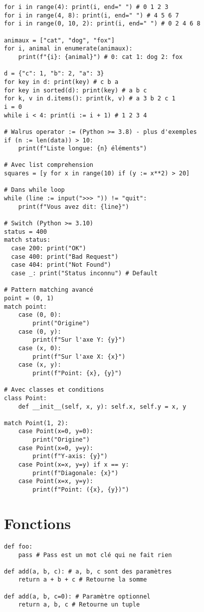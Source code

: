 \documentclass{article}
\begin{document}
\begin{multicols*}{4}
\begin{lstlisting}
for i in range(4): print(i, end=" ") # 0 1 2 3
for i in range(4, 8): print(i, end=" ") # 4 5 6 7
for i in range(0, 10, 2): print(i, end=" ") # 0 2 4 6 8

animaux = ["cat", "dog", "fox"]
for i, animal in enumerate(animaux):
    print(f"{i}: {animal}") # 0: cat 1: dog 2: fox

d = {"c": 1, "b": 2, "a": 3}
for key in d: print(key) # c b a
for key in sorted(d): print(key) # a b c
for k, v in d.items(): print(k, v) # a 3 b 2 c 1
i = 0
while i < 4: print(i := i + 1) # 1 2 3 4

# Walrus operator := (Python >= 3.8) - plus d'exemples
if (n := len(data)) > 10:
    print(f"Liste longue: {n} éléments")

# Avec list comprehension
squares = [y for x in range(10) if (y := x**2) > 20]

# Dans while loop
while (line := input(">>> ")) != "quit":
    print(f"Vous avez dit: {line}")

# Switch (Python >= 3.10)
status = 400
match status:
  case 200: print("OK")
  case 400: print("Bad Request")
  case 404: print("Not Found")
  case _: print("Status inconnu") # Default

# Pattern matching avancé
point = (0, 1)
match point:
    case (0, 0):
        print("Origine")
    case (0, y):
        print(f"Sur l'axe Y: {y}")
    case (x, 0):
        print(f"Sur l'axe X: {x}")
    case (x, y):
        print(f"Point: {x}, {y}")

# Avec classes et conditions
class Point:
    def __init__(self, x, y): self.x, self.y = x, y

match Point(1, 2):
    case Point(x=0, y=0):
        print("Origine")
    case Point(x=0, y=y):
        print(f"Y-axis: {y}")
    case Point(x=x, y=y) if x == y:
        print(f"Diagonale: {x}")
    case Point(x=x, y=y):
        print(f"Point: ({x}, {y})")
\end{lstlisting}

\section*{Fonctions}
\begin{lstlisting}
def foo:
    pass # Pass est un mot clé qui ne fait rien

def add(a, b, c): # a, b, c sont des paramètres
    return a + b + c # Retourne la somme

def add(a, b, c=0): # Paramètre optionnel
    return a, b, c # Retourne un tuple


\end{lstlisting}
\end{multicols*}
\end{document}
